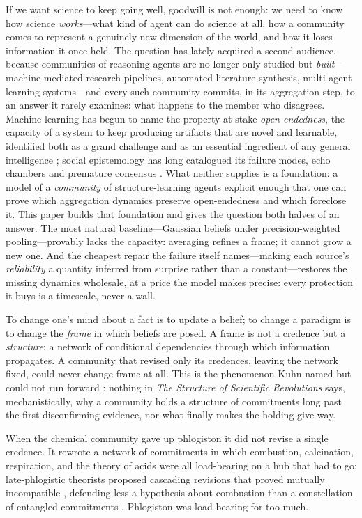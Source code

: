 \documentclass[runningheads]{llncs}
\begin{document}
If we want science to keep going well, goodwill is not enough: we need to know how science
\emph{works}---what kind of agent can do science at all, how a community comes to represent a
genuinely new dimension of the world, and how it loses information it once held. The question has
lately acquired a second audience, because communities of reasoning agents are no longer only
studied but \emph{built}---machine-mediated research pipelines, automated literature synthesis,
multi-agent learning systems---and every such community commits, in its aggregation step, to an
answer it rarely examines: what happens to the member who disagrees. Machine learning has begun
to name the property at stake \emph{open-endedness}, the capacity of a system to keep producing
artifacts that are novel and learnable, identified both as a grand challenge
\citep{stanley2017oe} and as an essential ingredient of any general intelligence
\citep{hughes2024}; social epistemology has long catalogued its failure modes, echo chambers
\citep{nguyen2018} and premature consensus \citep{zollman2010}. What neither supplies is a
foundation: a model of a \emph{community} of structure-learning agents explicit enough that one
can prove which aggregation dynamics preserve open-endedness and which foreclose it. This paper
builds that foundation and gives the question both halves of an answer. The most natural
baseline---Gaussian beliefs under precision-weighted pooling---provably lacks the capacity:
averaging refines a frame; it cannot grow a new one. And the cheapest repair the failure itself
names---making each source's \emph{reliability} a quantity inferred from surprise rather than a
constant---restores the missing dynamics wholesale, at a price the model makes precise: every
protection it buys is a timescale, never a wall.

To change one's mind about a fact is to update a belief; to change a paradigm is to change the
\emph{frame} in which beliefs are posed. A frame is not a credence but a \emph{structure}: a
network of conditional dependencies through which information propagates. A community that revised
only its credences, leaving the network fixed, could never change frame at all. This is the
phenomenon Kuhn named but could not run forward \citep{kuhn1962}: nothing in \emph{The Structure of
Scientific Revolutions} says, mechanistically, why a community holds a structure of commitments
long past the first disconfirming evidence, nor what finally makes the holding give way.

When the chemical community gave up phlogiston it did not revise a single credence. It rewrote a
network of commitments in which combustion, calcination, respiration, and the theory of acids were
all load-bearing on a hub that had to go: late-phlogistic theorists proposed cascading revisions that
proved mutually incompatible \citep{blumenthal2017,holmes2000}, defending less a hypothesis about
combustion than a constellation of entangled commitments \citep{boantza2011}. Phlogiston was
load-bearing for too much.
\end{document}
